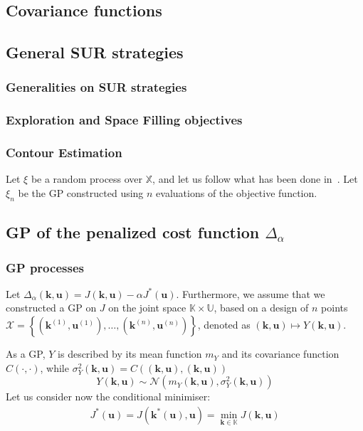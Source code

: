 \documentclass[a4paper,11pt]{article}
\newcommand{\Kspace}{\mathbb{K}}
\newcommand{\Uspace}{\mathbb{U}}
\newcommand{\Xspace}{\mathbb{X}}
\begin{document}
\subsection{Covariance functions}
\label{sec:cov_fun}


\subsection{General SUR strategies}
\label{sec:SUR_strat}
\subsubsection{Generalities on SUR strategies}

\subsubsection{Exploration and Space Filling objectives}

\subsubsection{Contour Estimation}
Let $\xi$ be a random process over $\Xspace$, and let us follow what has been done in~\cite{bect_sequential_2012}.
Let $\xi_n$ be the GP constructed using $n$ evaluations of the objective function.
\subsection{GP of the penalized cost function $\Delta_{\alpha}$}
\subsubsection{GP processes}
Let $\Delta_{\alpha}(\mathbf{k},\mathbf{u}) = J(\mathbf{k},\mathbf{u}) - \alpha J^*(\mathbf{u})$. Furthermore, we assume that we constructed a GP on $J$ on the joint space $\Kspace \times \Uspace$, based on a design of $n$ points $\mathcal{X} = \left\{(\mathbf{k}^{(1)},\mathbf{u}^{(1)}),\dots,(\mathbf{k}^{(n)},\mathbf{u}^{(n)}) \right\}$, denoted as $(\mathbf{k},\mathbf{u})\mapsto Y(\mathbf{k},\mathbf{u})$.

As a GP, $Y$ is described by its mean function $m_{Y}$ and its covariance function $C(\cdot, \cdot)$, while $\sigma^2_Y(\mathbf{k},\mathbf{u}) = C((\mathbf{k},\mathbf{u}), (\mathbf{k},\mathbf{u}))$
\begin{equation}
  Y(\mathbf{k},\mathbf{u}) \sim \mathcal{N}\left(m_{Y}(\mathbf{k},\mathbf{u}), \sigma^2_Y(\mathbf{k},\mathbf{u}) \right)
\end{equation}
Let us consider now the conditional minimiser:
\begin{align}
  J^*(\mathbf{u}) = J(\mathbf{k}^*(\mathbf{u}),\mathbf{u}) = \min_{\mathbf{k}\in\Kspace} J(\mathbf{k},\mathbf{u})
\end{align}
\end{document}
